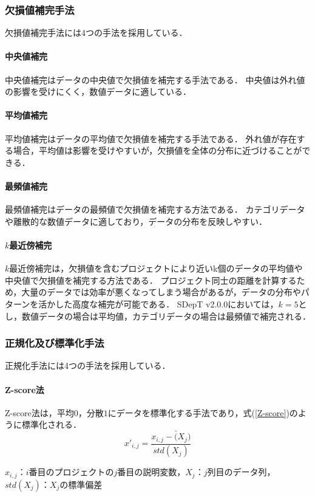 \subsubsection{欠損値補完手法}\label{Imputation}
欠損値補完手法には4つの手法を採用している．
\paragraph{中央値補完 \quad \\}
中央値補完はデータの中央値で欠損値を補完する手法である．
中央値は外れ値の影響を受けにくく，数値データに適している．
\paragraph{平均値補完 \quad \\}
平均値補完はデータの平均値で欠損値を補完する手法である．
外れ値が存在する場合，平均値は影響を受けやすいが，欠損値を全体の分布に近づけることができる．
\paragraph{最頻値補完 \quad \\}
最頻値補完はデータの最頻値で欠損値を補完する方法である．
カテゴリデータや離散的な数値データに適しており，データの分布を反映しやすい．
\paragraph{$k$最近傍補完 \quad \\}
$k$最近傍補完は，欠損値を含むプロジェクトにより近いk個のデータの平均値や中央値で欠損値を補完する方法である．
プロジェクト同士の距離を計算するため，大量のデータでは効率が悪くなってしまう場合があるが，データの分布やパターンを活かした高度な補完が可能である．
SDepT v2.0.0においては，$k=5$とし，数値データの場合は平均値，カテゴリデータの場合は最頻値で補完される．

\subsubsection{正規化及び標準化手法}\label{Normalization}
正規化手法には4つの手法を採用している．
\paragraph{Z-score法 \quad \\}
Z-score法\cite{Huang2017}は，平均$0$，分散$1$にデータを標準化する手法であり，式(\ref{Z-score})のように標準化される．
\begin{equation}
  \label{Z-score}
  x'_{i,j} = \frac{x_{i,j} - \bar(X_j)}{std(X_j)}
\end{equation}
\begin{center}
  $x_{i,j}$：$i$番目のプロジェクトの$j$番目の説明変数，$X_j$：$j$列目のデータ列，$std(X_j)$：$X_j$の標準偏差
\end{center}


